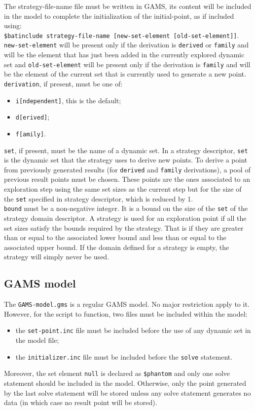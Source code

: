 The strategy-file-name file must be written in GAMS, its content will be
included in the model to complete the initialization of the initial-point, as if
included using:\\
\texttt{\$batinclude strategy-file-name [new-set-element
  [old-set-element]]}. \texttt{new-set-element} will be present only if the
derivation is \texttt{derived} or \texttt{family} and will be the element that
has just been added in the currently explored dynamic set and
\texttt{old-set-element} will be present only if the derivation is
\texttt{family} and will be the element of the current set that is currently
used to generate a new point.\\
\texttt{derivation}, if present, must be one of:
\begin{itemize}
\item \texttt{i[ndependent]}, this is the default;
\item \texttt{d[erived]};
\item \texttt{f[amily]}.
\end{itemize}
\texttt{set}, if present, must be the name of a dynamic set. In a strategy
descriptor, \texttt{set} is the dynamic set that the strategy uses to derive new
points. To derive a point from previously generated results (for
\texttt{derived} and \texttt{family} derivations), a pool of previous result
points must be chosen. These points are the ones associated to an exploration
step using the same set sizes as the current step but for the size of the
\texttt{set} specified in strategy descriptor, which is reduced by 1.\\
\texttt{bound} must be a non-negative integer. It is a bound on the size of the
\texttt{set} of the strategy domain descriptor. A strategy is used for an
exploration point if all the set sizes satisfy the bounds required by the
strategy. That is if they are greater than or equal to the associated lower
bound and less than or equal to the associated upper bound. If the domain
defined for a strategy is empty, the strategy will simply never be used.

\subsection*{GAMS model}

The \texttt{GAMS-model.gms} is a regular GAMS model. No major restriction apply
to it. However, for the script to function, two files must be included within
the model:
\begin{itemize}
\item the \texttt{set-point.inc} file must be included before the use of any
  dynamic set in the model file;
\item the \texttt{initializer.inc} file must be included before the
  \texttt{solve} statement.
\end{itemize}
Moreover, the set element \texttt{null} is declared as \texttt{\$phantom} and
only one solve statement should be included in the model. Otherwise, only the
point generated by the last solve statement will be stored unless any solve
statement generates no data (in which case no result point will be stored).

